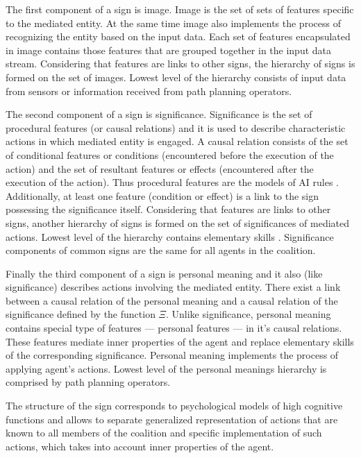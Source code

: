 \documentclass[runningheads,a4paper]{llncs}
\begin{document}
The first component of a sign is image. Image is the set of sets of features specific to the mediated entity. At the same time image also implements the process of recognizing the entity based on the input data. Each set of features encapsulated in image contains those features that are grouped together in the input data stream. Considering that features are links to other signs, the hierarchy of signs is formed on the set of images. Lowest level of the hierarchy consists of input data from sensors or information received from path planning operators.

The second component of a sign is significance. Significance is the set of procedural features (or causal relations) and it is used to describe characteristic actions in which mediated entity is engaged. A causal relation consists of the set of conditional features or conditions (encountered before the execution of the action) and the set of resultant features or effects (encountered after the execution of the action). Thus procedural features are the models of AI rules \cite{Nilsson1998}. Additionally, at least one feature (condition or effect) is a link to the sign possessing the significance itself. Considering that features are links to other signs, another hierarchy of signs is formed on the set of significances of mediated actions. Lowest level of the hierarchy contains elementary skills . Significance components of common signs are the same for all agents in the coalition.

Finally the third component of a sign is personal meaning and it also (like significance) describes actions involving the mediated entity. There exist a link between a causal relation of the personal meaning and a causal relation of the significance defined by the function $\Xi$. Unlike significance, personal meaning contains special type of features --- personal features --- in it's causal relations. These features mediate inner properties of the agent and replace elementary skills of the corresponding significance. Personal meaning implements the process of applying agent's actions. Lowest level of the personal meanings hierarchy is comprised by path planning operators. 

The structure of the sign corresponds to psychological models of high cognitive functions \cite{Vygotsky1986,Leontyev2009} and allows to separate generalized representation of actions that are known to all members of the coalition and specific implementation of such actions, which takes into account inner properties of the agent.
\end{document}
